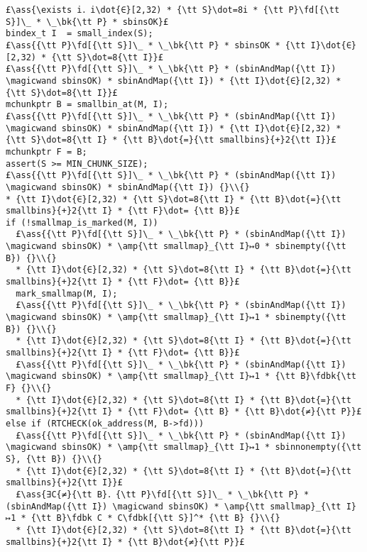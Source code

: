 \documentclass[10pt,a4paper,twoside]{report}
\makeatletter
\newcommand{\ml}[2][t]{\mbox{\mdseries\begin{tabular}[#1]{@{}L@{}}#2\end{tabular}}}
\newcommand{\ass}[1]{\ensuremath{{\color{blue}\left\{\ml[c]{#1}\right\}}}}
\makeatother
\begin{document}
\begin{lstlisting}
£\ass{\exists i．i\dot{∈}[2,32) * {\tt S}\dot=8i * {\tt P}\fd[{\tt S}]\_ * \_\bk{\tt P} * sbinsOK}£
bindex_t I  = small_index(S);
£\ass{{\tt P}\fd[{\tt S}]\_ * \_\bk{\tt P} * sbinsOK * {\tt I}\dot{∈}[2,32) * {\tt S}\dot=8{\tt I}}£
£\ass{{\tt P}\fd[{\tt S}]\_ * \_\bk{\tt P} * (sbinAndMap({\tt I}) \magicwand sbinsOK) * sbinAndMap({\tt I}) * {\tt I}\dot{∈}[2,32) * {\tt S}\dot=8{\tt I}}£
mchunkptr B = smallbin_at(M, I);
£\ass{{\tt P}\fd[{\tt S}]\_ * \_\bk{\tt P} * (sbinAndMap({\tt I}) \magicwand sbinsOK) * sbinAndMap({\tt I}) * {\tt I}\dot{∈}[2,32) * {\tt S}\dot=8{\tt I} * {\tt B}\dot{=}{\tt smallbins}{+}2{\tt I}}£
mchunkptr F = B;
assert(S >= MIN_CHUNK_SIZE);
£\ass{{\tt P}\fd[{\tt S}]\_ * \_\bk{\tt P} * (sbinAndMap({\tt I}) \magicwand sbinsOK) * sbinAndMap({\tt I}) {}\\{} 
* {\tt I}\dot{∈}[2,32) * {\tt S}\dot=8{\tt I} * {\tt B}\dot{=}{\tt smallbins}{+}2{\tt I} * {\tt F}\dot= {\tt B}}£
if (!smallmap_is_marked(M, I))
  £\ass{{\tt P}\fd[{\tt S}]\_ * \_\bk{\tt P} * (sbinAndMap({\tt I}) \magicwand sbinsOK) * \amp{\tt smallmap}_{\tt I}↦0 * sbinempty({\tt B}) {}\\{} 
  * {\tt I}\dot{∈}[2,32) * {\tt S}\dot=8{\tt I} * {\tt B}\dot{=}{\tt smallbins}{+}2{\tt I} * {\tt F}\dot= {\tt B}}£
  mark_smallmap(M, I);
  £\ass{{\tt P}\fd[{\tt S}]\_ * \_\bk{\tt P} * (sbinAndMap({\tt I}) \magicwand sbinsOK) * \amp{\tt smallmap}_{\tt I}↦1 * sbinempty({\tt B}) {}\\{} 
  * {\tt I}\dot{∈}[2,32) * {\tt S}\dot=8{\tt I} * {\tt B}\dot{=}{\tt smallbins}{+}2{\tt I} * {\tt F}\dot= {\tt B}}£
  £\ass{{\tt P}\fd[{\tt S}]\_ * \_\bk{\tt P} * (sbinAndMap({\tt I}) \magicwand sbinsOK) * \amp{\tt smallmap}_{\tt I}↦1 * {\tt B}\fdbk{\tt F} {}\\{} 
  * {\tt I}\dot{∈}[2,32) * {\tt S}\dot=8{\tt I} * {\tt B}\dot{=}{\tt smallbins}{+}2{\tt I} * {\tt F}\dot= {\tt B} * {\tt B}\dot{≠}{\tt P}}£
else if (RTCHECK(ok_address(M, B->fd)))
  £\ass{{\tt P}\fd[{\tt S}]\_ * \_\bk{\tt P} * (sbinAndMap({\tt I}) \magicwand sbinsOK) * \amp{\tt smallmap}_{\tt I}↦1 * sbinnonempty({\tt S}, {\tt B}) {}\\{} 
  * {\tt I}\dot{∈}[2,32) * {\tt S}\dot=8{\tt I} * {\tt B}\dot{=}{\tt smallbins}{+}2{\tt I}}£
  £\ass{∃C{≠}{\tt B}．{\tt P}\fd[{\tt S}]\_ * \_\bk{\tt P} * (sbinAndMap({\tt I}) \magicwand sbinsOK) * \amp{\tt smallmap}_{\tt I}↦1 * {\tt B}\fdbk C * C\fdbk[{\tt S}]^* {\tt B} {}\\{} 
  * {\tt I}\dot{∈}[2,32) * {\tt S}\dot=8{\tt I} * {\tt B}\dot{=}{\tt smallbins}{+}2{\tt I} * {\tt B}\dot{≠}{\tt P}}£

\end{lstlisting}
\end{document}
